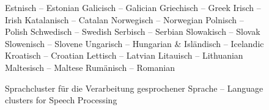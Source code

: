 \documentclass[]{../../metanetpaper}
\begin{document}
\begin{Parallel}[c]{79mm}{78mm}
\begin{figure}
\begin{tabular}
Estnisch -- \textcolor{grey3}{Estonian} \newline 
Galicisch -- \textcolor{grey3}{Galician} \newline 
Griechisch -- \textcolor{grey3}{Greek} \newline  
Irisch -- \textcolor{grey3}{Irish} \newline  
Katalanisch -- \textcolor{grey3}{Catalan} \newline 
Norwegisch -- \textcolor{grey3}{Norwegian} \newline 
Polnisch -- \textcolor{grey3}{Polish} \newline 
Schwedisch -- \textcolor{grey3}{Swedish} \newline
Serbisch -- \textcolor{grey3}{Serbian} \newline 
Slowakisch -- \textcolor{grey3}{Slovak} \newline 
Slowenisch -- \textcolor{grey3}{Slovene} \newline 
Ungarisch -- \textcolor{grey3}{Hungarian}  
& Isländisch -- \textcolor{grey3}{Icelandic} \newline  
Kroatisch -- \textcolor{grey3}{Croatian} \newline 
Lettisch -- \textcolor{grey3}{Latvian} \newline 
Litauisch -- \textcolor{grey3}{Lithuanian} \newline 
Maltesisch -- \textcolor{grey3}{Maltese} \newline 
Rumänisch -- \textcolor{grey3}{Romanian}\\
\end{tabular}
\label{fig:speech_cluster}
\caption{Sprachcluster für die Verarbeitung gesprochener Sprache -- \textcolor{grey3}{Language clusters for Speech Processing}}
\end{figure}


\end{Parallel}
\end{document}
